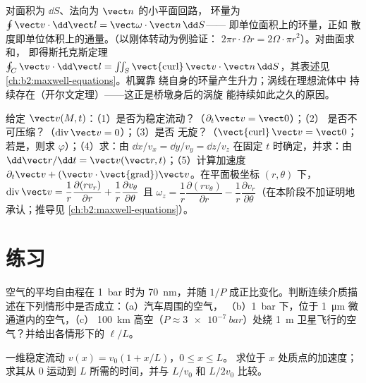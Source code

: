 \begin{remark}[为何环量重要]\label{rem:b2:fluid-kinematics:stokes}
对面积为 $\dd S$、法向为 $\vect n$ 的小平面回路，
环量为 $\oint\vect v\cdot\dd\vect l = \vect\omega\cdot\vect n\,\dd S$——
即单位面积上的环量，正如
散度即单位体积上的通量。（以刚体转动为例验证：
$2\pi r\cdot\Omega r = 2\Omega\cdot\pi r^2$）。对曲面求和，
即得斯托克斯定理 $\oint_C\vect v\cdot\dd\vect l = \iint_S
\operatorname{\vect{curl}}\vect v\cdot\vect n\,\dd S$，其表述见
\cref{ch:b2:maxwell-equations}。机翼靠
绕自身的环量产生升力；涡线在理想流体中
持续存在（开尔文定理）——这正是桥墩身后的涡旋
能持续如此之久的原因。
\end{remark}

\begin{method}[读取速度场]\label{met:b2:fluid-kinematics:reading}
给定 $\vect v(M, t)$：（1）是否为稳定流动？（$\partial_t\vect v = \vect 0$）；（2）
是否不可压缩？（$\operatorname{div}\vect v = 0$）；（3）是否
无旋？（$\operatorname{\vect{curl}}\vect v = \vect 0$；若是，则求
$\varphi$）；（4）求：由 $\dd x/v_x = \dd y/v_y = \dd z/
v_z$ 在固定 $t$ 时确定，并求：由 $\dd\vect r/\dd t = \vect v(\vect r,
t)$；（5）计算加速度 $\partial_t\vect v + (\vect v\cdot
\operatorname{\vect{grad}})\vect v$。在平面极坐标 $(r, \theta)$ 下，
$\operatorname{div}\vect v = \dfrac1r\dfrac{\partial(rv_r)}{\partial r} + \dfrac1r
\dfrac{\partial v_\theta}{\partial\theta}$ 且 $\omega_z = \dfrac1r\dfrac{\partial(rv_\theta)}
{\partial r} - \dfrac1r\dfrac{\partial v_r}{\partial\theta}$（在本阶段不加证明地承认；推导见
\cref{ch:b2:maxwell-equations}）。
\end{method}

\section{练习}

\begin{exercise}[$\star$]\label{exo:b2:fluid-kinematics:1}
空气的平均自由程在 \qty{1}{bar} 时为 \qty{70}{nm}，并随
$1/P$ 成正比变化。判断连续介质描述在下列情形中是否成立：（a）汽车周围的空气，
（b）\qty{1}{bar} 下，位于 \qty{1}{\micro m} 微通道内的空气，（c）
\qty{100}{km} 高空（$P \approx \qty{3e-7}{bar}$）处绕
\qty{1}{m} 卫星飞行的空气？并给出各情形下的 $\ell/L$。
\end{exercise}

\begin{exercise}[$\star$]\label{exo:b2:fluid-kinematics:2}
一维稳定流动 $v(x) = v_0(1 + x/L)$，$0 \le x \le L$。
求位于 $x$ 处质点的加速度；求其从 $0$ 运动到
$L$ 所需的时间，并与 $L/v_0$ 和 $L/2v_0$ 比较。
\end{exercise}

